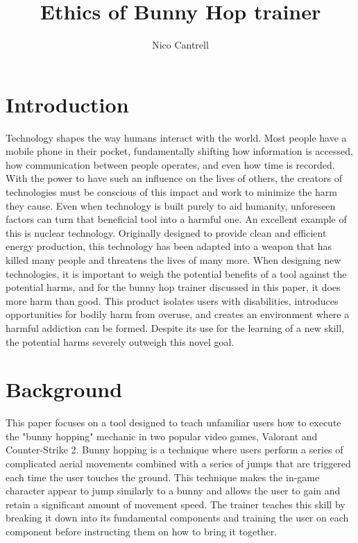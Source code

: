 \documentclass[10pt,twocolumn]{article}
\title{Ethics of Bunny Hop trainer}
\author{Nico Cantrell}
\affiliation{Occidental College}
\begin{document}
\maketitle
\section{Introduction}

Technology shapes the way humans interact with the world. Most people have a mobile phone in their pocket, fundamentally shifting how information is accessed, how communication between people operates, and even how time is recorded. With the power to have such an influence on the lives of others, the creators of technologies must be conscious of this impact and work to minimize the harm they cause. Even when technology is built purely to aid humanity, unforeseen factors can turn that beneficial tool into a harmful one. An excellent example of this is nuclear technology. Originally designed to provide clean and efficient energy production, this technology has been adapted into a weapon that has killed many people and threatens the lives of many more. When designing new technologies, it is important to weigh the potential benefits of a tool against the potential harms, and for the bunny hop trainer discussed in this paper, it does more harm than good. This product isolates users with disabilities, introduces opportunities for bodily harm from overuse, and creates an environment where a harmful addiction can be formed. Despite its use for the learning of a new skill, the potential harms severely outweigh this novel goal.

\section{Background}
This paper focuses on a tool designed to teach unfamiliar users how to execute the "bunny hopping" mechanic in two popular video games, Valorant and Counter-Strike 2. Bunny hopping is a technique where users perform a series of complicated aerial movements combined with a series of jumps that are triggered each time the user touches the ground. This technique makes the in-game character appear to jump similarly to a bunny and allows the user to gain and retain a significant amount of movement speed. The trainer teaches this skill by breaking it down into its fundamental components and training the user on each component before instructing them on how to bring it together.
\end{document}
